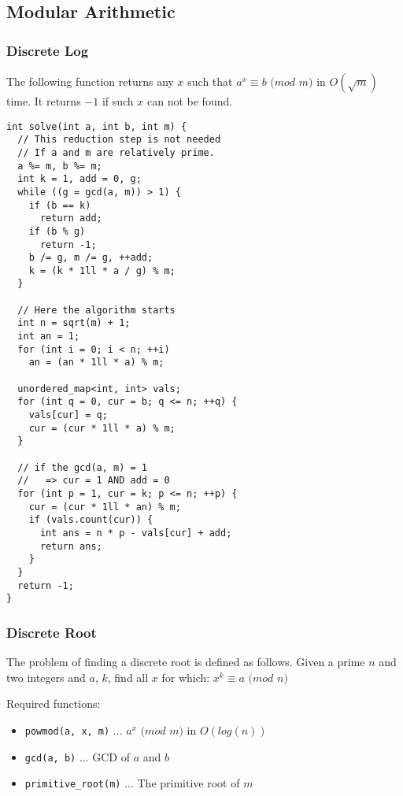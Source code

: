 \newpage
\subsection{Modular Arithmetic}

\begin{center}
\begin{minipage}[t]{0.45\linewidth}
\subsubsection{Discrete Log}

The following function returns any $x$ such that $a^x \equiv b$ $(mod$ $m)$ in $O(\sqrt{m})$ time.
It returns $-1$ if such $x$ can not be found. \cite{DiscreteLogCPAlgo}
  
\begin{lstlisting}
int solve(int a, int b, int m) {
  // This reduction step is not needed
  // If a and m are relatively prime.
  a %= m, b %= m;
  int k = 1, add = 0, g;
  while ((g = gcd(a, m)) > 1) {
    if (b == k)
      return add;
    if (b % g)
      return -1;
    b /= g, m /= g, ++add;
    k = (k * 1ll * a / g) % m;
  }

  // Here the algorithm starts
  int n = sqrt(m) + 1;
  int an = 1;
  for (int i = 0; i < n; ++i)
    an = (an * 1ll * a) % m;

  unordered_map<int, int> vals;
  for (int q = 0, cur = b; q <= n; ++q) {
    vals[cur] = q;
    cur = (cur * 1ll * a) % m;
  }

  // if the gcd(a, m) = 1
  //   => cur = 1 AND add = 0
  for (int p = 1, cur = k; p <= n; ++p) {
    cur = (cur * 1ll * an) % m;
    if (vals.count(cur)) {
      int ans = n * p - vals[cur] + add;
      return ans;
    }
  }
  return -1;
}
\end{lstlisting}
\end{minipage}
\qquad
\begin{minipage}[t]{0.45\linewidth}
\subsubsection{Discrete Root}

The problem of finding a discrete root is defined as follows.
Given a prime $n$ and two integers and $a$, $k$, find all $x$ for which:
$x^k \equiv a$ $(mod$ $n)$ \cite{DiscreteRootCPAlgo}

Required functions:
{
\begin{itemize}
  \item{\lstinline{powmod(a, x, m)} ... $a^x$ $(mod$ $m)$ in $O(log(n))$}
  \item{\lstinline{gcd(a, b)} ... GCD of $a$ and $b$}
  \item{\lstinline{primitive_root(m)} ... The primitive root of $m$}
\end{itemize}
}


\end{minipage}
\end{center}
